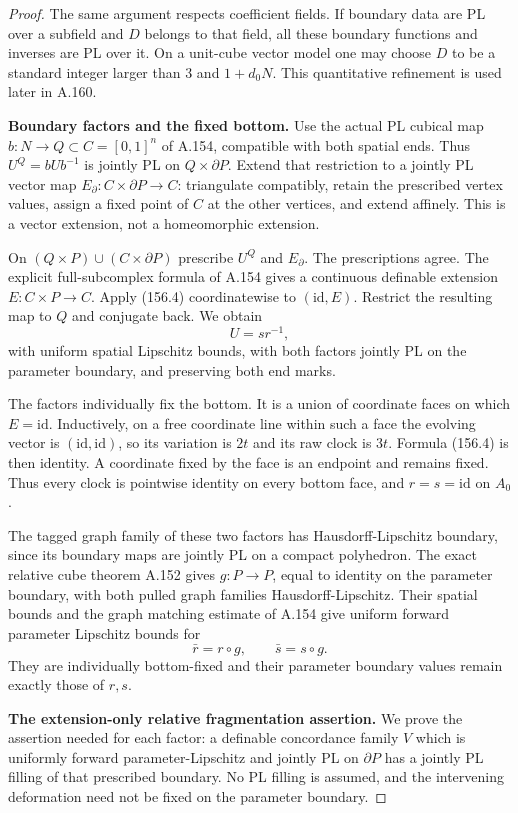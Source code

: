 \begin{proof}
The same argument respects coefficient fields. If boundary
data are PL over a subfield and $D$ belongs to that field,
all these boundary functions and inverses are PL over it.
On a unit-cube vector model one may choose $D$ to be a
standard integer larger than $3$ and $1+d_0N$.
This quantitative refinement is used later in A.160.

\textbf{Boundary factors and the fixed bottom.}\quad
Use the actual PL cubical map $b:N\to Q\subset C=[0,1]^n$
of A.154, compatible with both spatial ends. Thus
$U^Q=bUb^{-1}$ is jointly PL on $Q\times\partial P$.
Extend that restriction to a jointly PL vector map
$E_\partial:C\times\partial P\to C$: triangulate compatibly,
retain the prescribed vertex values, assign a fixed point
of $C$ at the other vertices, and extend affinely.
This is a vector extension, not a homeomorphic extension.

On $(Q\times P)\cup(C\times\partial P)$ prescribe $U^Q$
and $E_\partial$. The prescriptions agree. The explicit
full-subcomplex formula of A.154 gives a continuous definable
extension $E:C\times P\to C$. Apply (156.4) coordinatewise
to $(\mathrm{id},E)$. Restrict the resulting map to $Q$
and conjugate back. We obtain
\[
 U=s r^{-1},
 \tag{156.6}
\]
with uniform spatial Lipschitz bounds, with both factors
jointly PL on the parameter boundary, and preserving both
end marks.

The factors individually fix the bottom. It is a union
of coordinate faces on which $E=\mathrm{id}$. Inductively,
on a free coordinate line within such a face the evolving
vector is $(\mathrm{id},\mathrm{id})$, so its variation is
$2t$ and its raw clock is $3t$. Formula (156.4) is then
identity. A coordinate fixed by the face is an endpoint
and remains fixed. Thus every clock is pointwise identity
on every bottom face, and $r=s=\mathrm{id}$ on $A_0$.

The tagged graph family of these two factors has
Hausdorff-Lipschitz boundary, since its boundary maps are
jointly PL on a compact polyhedron. The exact relative
cube theorem A.152 gives $g:P\to P$, equal to identity on
the parameter boundary, with both pulled graph families
Hausdorff-Lipschitz. Their spatial bounds and the graph
matching estimate of A.154 give uniform forward parameter
Lipschitz bounds for
\[
 \bar r=r\circ g,\qquad \bar s=s\circ g.
 \tag{156.7}
\]
They are individually bottom-fixed and their parameter
boundary values remain exactly those of $r,s$.

\textbf{The extension-only relative fragmentation assertion.}\quad
We prove the assertion needed for each factor: a definable
concordance family $V$ which is uniformly forward
parameter-Lipschitz and jointly PL on $\partial P$ has
a jointly PL filling of that prescribed boundary.
No PL filling is assumed, and the intervening deformation
need not be fixed on the parameter boundary.


\end{proof}
